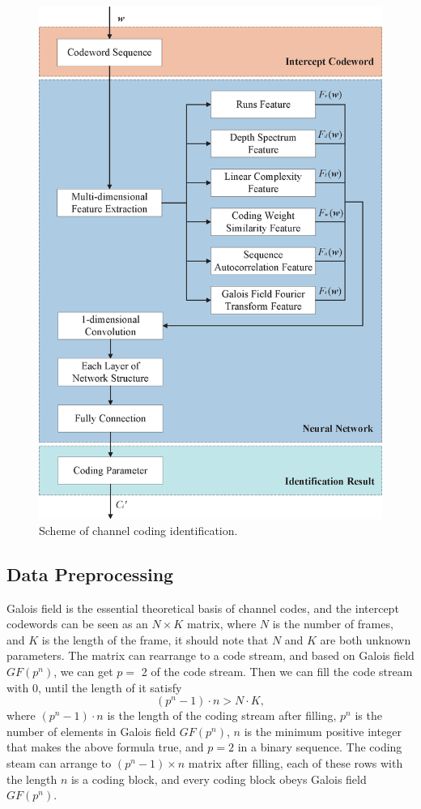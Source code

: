 \documentclass[conference]{IEEEtran}
\begin{document}
\begin{figure}[tbp]
	\centerline{\includegraphics[scale=0.45]{figure-4-01.eps}}
	\caption{Scheme of channel coding identification.}%
\end{figure}

\subsection{Data Preprocessing}
Galois field is the essential theoretical basis of channel codes, and the intercept codewords can be seen as an $N \times K$ matrix, where $N$ is the number of frames, and $K$ is the length of the frame, it should note that $N$ and $K$ are both unknown parameters. The matrix can rearrange to a code stream, and based on Galois field $GF(p^n)$, we can get $p =$ 2 of the code stream. Then we can fill the code stream with 0, until the length of it satisfy
\begin{equation}
	(p^n - 1) \cdot n > N \cdot K,
\end{equation}
where $(p^n - 1) \cdot n$ is the length of the coding stream after filling, $p^n$ is the number of elements in Galois field $GF(p^n)$, $n$ is the minimum positive integer that makes the above formula true, and $p = 2$ in a binary sequence. The coding steam can arrange to $(p^n - 1) \times n$ matrix after filling, each of these rows with the length $n$ is a coding block, and every coding block obeys Galois field $GF(p^n)$.
\end{document}
